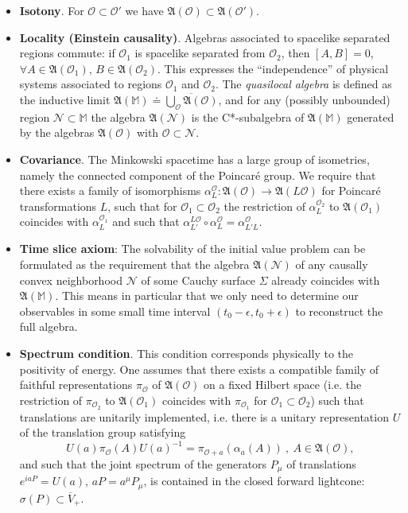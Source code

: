 \documentclass[11pt]{article}
\newcommand{\fA}{\mathfrak{A}}
\newcommand{\Ncal}{\mathcal{N}}
\newcommand{\Ocal}{\mathcal{O}}
\newcommand{\M}{\mathbb{M}} 	     %
\newcommand{\1}{\mathds{1}}                         %
\begin{document}
\begin{itemize}
	\item {\bf Isotony}. For $\Ocal\subset \Ocal'$ we have $\fA(\Ocal)\subset \fA(\Ocal')$.
	\item {\bf Locality (Einstein causality)}. Algebras associated to spacelike separated regions commute: if
$\Ocal_1$ is spacelike separated from $\Ocal_2$, then $[A, B] = 0$, $\forall A \in \fA(\Ocal_1)$, $B \in \fA(\Ocal_2)$. This expresses the ``independence'' of physical systems associated to regions  $\Ocal_1$ and $\Ocal_2$. The \textit{quasilocal algebra} is defined as the inductive limit $\fA(\M)\doteq\overline{\bigcup\limits_\Ocal\fA(\Ocal)}$, and for any (possibly unbounded) region $\Ncal\subset\M$ the algebra $\fA(\Ncal)$ is the C*-subalgebra of $\fA(\M)$ generated by the algebras $\fA(\Ocal)$ with $\Ocal\subset \Ncal$.
	\item {\bf Covariance}. The Minkowski spacetime has a large group of isometries, namely the connected component of the Poincar\'e group. We require that  there exists a family of isomorphisms $\alpha_L^\Ocal : \fA(\Ocal) \rightarrow\fA(L \Ocal)$ for Poincar\'e transformations $L$, such that for
$\Ocal_1 \subset \Ocal_2$ the restriction of $\alpha_L^{\Ocal_2}$ to $\fA(\Ocal_1)$ coincides with $\alpha_L^{\Ocal_1}$ and such that $\alpha^{L\Ocal}_{L'}\circ \alpha^{\Ocal}_{L}=\alpha^{\Ocal}_{L'L}$.
	\item {\bf Time slice axiom}: The solvability of the initial value problem can be formulated as the requirement that the algebra $\mathfrak{A}(\Ncal)$ of any causally convex neighborhood $\Ncal$ of some Cauchy surface $\Sigma$ already coincides with $\mathfrak{A}(\M)$. This means in particular that we only need to determine our observables in some small time interval $(t_0-\epsilon,t_0+\epsilon)$ to reconstruct the full algebra.
	\item {\bf Spectrum condition}. This condition corresponds physically to the positivity of energy. One assumes that there exists a compatible family of faithful representations $\pi_{\Ocal}$ of 
	$\fA(\Ocal)$ on a fixed Hilbert space (i.e. the restriction of $\pi_{\Ocal_2}$ to $\fA(\Ocal_1)$ coincides with $\pi_{\Ocal_1}$ for $\Ocal_1\subset\Ocal_2$) such that translations are unitarily implemented, i.e. there is a unitary representation $U$ of the translation group satisfying
	\[U(a)\pi_{\Ocal}(A)U(a)^{-1}=\pi_{\Ocal+a}(\alpha_a(A))\ ,\ A\in\fA(\Ocal),\]
	and such that the joint spectrum of the generators $P_{\mu}$ of translations $e^{iaP}=U(a)$, $aP=a^\mu P_\mu$, is contained in the closed forward lightcone: $\sigma(P)\subset \overline{V}_+$. %
	\end{itemize}
\end{document}
